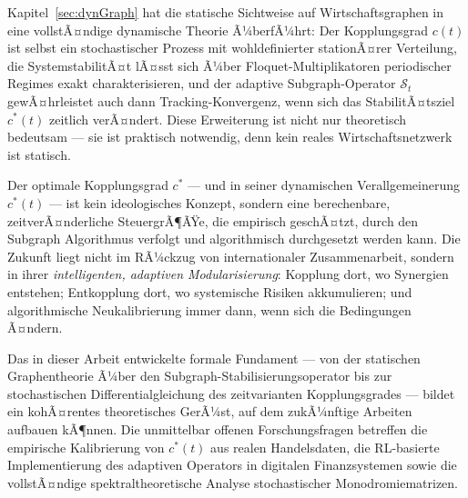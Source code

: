 ﻿\documentclass[a4paper,12pt]{article}
\theoremstyle{definition}
\begin{document}
Kapitel~\ref{sec:dynGraph} hat die statische Sichtweise auf Wirtschaftsgraphen in eine
vollstÃ¤ndige dynamische Theorie Ã¼berfÃ¼hrt: Der Kopplungsgrad $c(t)$ ist selbst ein
stochastischer Prozess mit wohldefinierter stationÃ¤rer Verteilung, die SystemstabilitÃ¤t
lÃ¤sst sich Ã¼ber Floquet-Multiplikatoren periodischer Regimes exakt charakterisieren,
und der adaptive Subgraph-Operator $\mathcal{S}_t$ gewÃ¤hrleistet auch dann Tracking-Konvergenz,
wenn sich das StabilitÃ¤tsziel $c^*(t)$ zeitlich verÃ¤ndert. Diese Erweiterung ist nicht nur
theoretisch bedeutsam --- sie ist praktisch notwendig, denn kein reales Wirtschaftsnetzwerk
ist statisch.

Der optimale Kopplungsgrad $c^*$ --- und in seiner dynamischen Verallgemeinerung $c^*(t)$
--- ist kein ideologisches Konzept, sondern eine berechenbare, zeitverÃ¤nderliche SteuergrÃ¶ÃŸe,
die empirisch geschÃ¤tzt, durch den Subgraph Algorithmus verfolgt und algorithmisch
durchgesetzt werden kann. Die Zukunft liegt nicht im RÃ¼ckzug von internationaler
Zusammenarbeit, sondern in ihrer \emph{intelligenten, adaptiven Modularisierung}:
Kopplung dort, wo Synergien entstehen; Entkopplung dort, wo systemische Risiken akkumulieren;
und algorithmische Neukalibrierung immer dann, wenn sich die Bedingungen Ã¤ndern.

Das in dieser Arbeit entwickelte formale Fundament --- von der statischen Graphentheorie
Ã¼ber den Subgraph-Stabilisierungsoperator bis zur stochastischen Differentialgleichung
des zeitvarianten Kopplungsgrades --- bildet ein kohÃ¤rentes theoretisches GerÃ¼st, auf dem
zukÃ¼nftige Arbeiten aufbauen kÃ¶nnen. Die unmittelbar offenen Forschungsfragen betreffen
die empirische Kalibrierung von $c^*(t)$ aus realen Handelsdaten, die RL-basierte
Implementierung des adaptiven Operators in digitalen Finanzsystemen sowie die
vollstÃ¤ndige spektraltheoretische Analyse stochastischer Monodromiematrizen.
\end{document}

